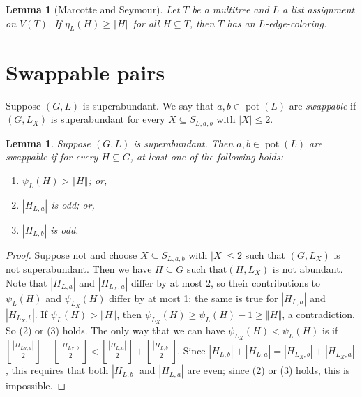 \documentclass[12pt]{article}
\theoremstyle{plain}
\newtheorem{lem}[thm]{Lemma}
\theoremstyle{definition}
\theoremstyle{remark}
\newcommand{\card}[1]{\left|#1\right|}
\newcommand{\size}[1]{\left\Vert#1\right\Vert}
\newcommand{\floor}[1]{\left\lfloor#1\right\rfloor}
\newcommand{\pot}{\operatorname{pot}}
\begin{document}
\begin{lem}[Marcotte and Seymour]\label{MultiTreeHall}
	Let $T$ be a multitree and $L$ a list assignment on $V(T)$.  If $\eta_L(H) \ge
	\size{H}$ for all $H \subseteq T$, then $T$ has an $L$-edge-coloring.
\end{lem}

\section{Swappable pairs}
Suppose $(G,L)$ is superabundant.  We say that $a,b \in \pot(L)$ are \emph{swappable} if $(G,L_X)$ is superabundant for every $X \subseteq S_{L,a,b}$ with $\card{X} \le 2$.

\begin{lem}\label{SwappableCondition}
	Suppose $(G, L)$ is superabundant.  Then $a, b \in \pot(L)$ are swappable if for every $H \subseteq G$, at least one of the following holds:
	\begin{enumerate}
		\item $\psi_L(H) > \size{H}$; or,
		\item $\card{H_{L, a}}$ is odd; or,
		\item $\card{H_{L, b}}$ is odd.
	\end{enumerate}
\end{lem}
%
\begin{proof}
	Suppose not and choose $X \subseteq S_{L,a,b}$ with $\card{X} \le 2$ such that $(G,L_X)$ is not superabundant.  
	Then we have $H \subseteq G$ such that$(H,L_X)$ is not abundant.  Note that $\card{H_{L,a}}$ and
	$\card{H_{L_X,a}}$ differ by at most 2, so their contributions to
	$\psi_L(H)$ and $\psi_{L_X}(H)$ differ by at most 1; the same is true for
	$\card{H_{L,a}}$ and $\card{H_{L_X,b}}$.  
	If $\psi_L(H)>\size{H}$, then $\psi_{L_X}(H) \ge \psi_L(H)-1\ge \size{H}$, a contradiction.
	So (2) or (3) holds.	The only way that we can have
	$\psi_{L_X}(H)<\psi_L(H)$ is if $\floor{\frac{\card{H_{L_X, a}}}{2}} +
	\floor{\frac{\card{H_{L_X, b}}}{2}} < \floor{\frac{\card{H_{L, a}}}{2}}
	+ \floor{\frac{\card{H_{L, b}}}{2}}$.  
	Since $\card{H_{L, b}} + \card{H_{L, a}} = \card{H_{L_X, b}} +
	\card{H_{L_X, a}}$,   this requires that both $\card{H_{L, b}}$ and
	$\card{H_{L, a}}$ are even; since (2) or (3) holds, this is impossible.
\end{proof}
\end{document}
